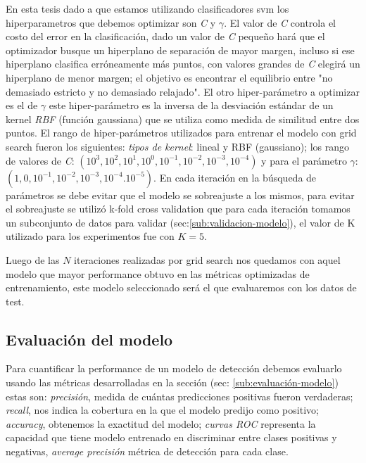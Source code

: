En esta tesis dado a que estamos utilizando clasificadores \ac{svm} los hiperparametros que debemos optimizar son \textit{C} y $\gamma$. El valor de \textit{C} controla el costo del error en la clasificación, dado un valor de \textit{C} pequeño hará que el optimizador busque un hiperplano de separación de mayor margen, incluso si ese hiperplano clasifica erróneamente más puntos, con valores grandes de \textit{C} elegirá un hiperplano de menor margen; el objetivo es encontrar el equilibrio entre "no demasiado estricto y no demasiado relajado". El otro hiper-parámetro a  optimizar es el de  $\gamma$ este hiper-parámetro es la inversa de la desviación estándar de un kernel \textit{RBF} (función gaussiana) que se utiliza como medida de similitud entre dos puntos. El rango de hiper-parámetros utilizados para entrenar el modelo con grid search fueron los siguientes: \textit{tipos de kernel}: lineal y RBF (gaussiano); los rango de valores de \textit{C}: $(10^{3}, 10^{2}, 10^{1}, 10^{0}, 10^{-1},10^{-2}, 10^{-3}, 10^{-4})$
    y para el parámetro $\gamma$: $(1,0,10^{-1}, 10^{-2},10^{-3},10^{-4}. 10^{-5})$. En cada iteración en la búsqueda de parámetros se debe evitar que el modelo se sobreajuste a los mismos, para evitar el sobreajuste se utilizó k-fold cross validation que para cada iteración tomamos un subconjunto de datos para validar (sec:\ref{sub:validacion-modelo}), el valor de K utilizado para los experimentos fue con $K = 5$.

Luego de las $N$ iteraciones realizadas por grid search nos quedamos con aquel modelo que mayor performance obtuvo en las métricas optimizadas de entrenamiento, este modelo seleccionado será el que evaluaremos con los datos de test.


\subsection*{Evaluación del modelo}\label{sub:evaluacion_class}

Para cuantificar la performance de un modelo de detección debemos evaluarlo usando las métricas desarrolladas en la sección (sec: \ref{sub:evaluación-modelo}) estas son: \textit{precisión}, medida de cuántas predicciones positivas fueron verdaderas; \textit{recall}, nos indica la cobertura en la que el modelo predijo como positivo; \textit{accuracy}, obtenemos la exactitud del modelo; \textit{curvas ROC} representa la capacidad que tiene modelo entrenado en discriminar entre clases positivas y negativas, \textit{average precisión} métrica de detección para cada clase.

